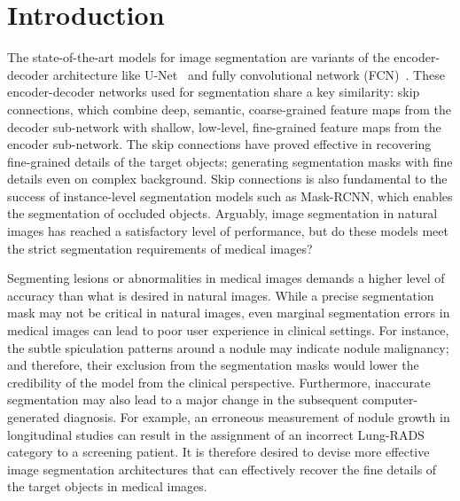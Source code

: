 \documentclass[runningheads]{llncs}
\begin{document}
\section{Introduction}
\label{sec:introduction}











The state-of-the-art models for image segmentation are variants of the encoder-decoder architecture like U-Net~\cite{ronneberger2015u} and fully convolutional network (FCN)~\cite{long2015fully}. These encoder-decoder networks used for segmentation share a key similarity: skip connections, which combine deep, semantic, coarse-grained feature maps from the decoder sub-network with shallow, low-level, fine-grained feature maps from the encoder sub-network. The skip connections have proved effective in recovering fine-grained details of the target objects; generating segmentation masks with fine details even on complex background. Skip connections is also fundamental to the success of instance-level segmentation models such as Mask-RCNN, which enables the segmentation of occluded objects. Arguably, image segmentation in natural images has reached a satisfactory level of performance, but do these models meet the strict segmentation requirements of medical images?


Segmenting lesions or abnormalities in medical images demands a higher level of accuracy than what is desired in natural images. While a precise segmentation mask may not be critical in natural images, even marginal segmentation errors in medical images can lead to poor user experience in clinical settings. For instance, the subtle spiculation patterns around a nodule may indicate nodule malignancy; and therefore, their exclusion from the segmentation masks would lower the credibility of the model from the clinical perspective. Furthermore, inaccurate segmentation may also lead to a major change in the subsequent computer-generated diagnosis. For example, an erroneous measurement of nodule growth in longitudinal studies can result in the assignment of an incorrect Lung-RADS category to a screening patient. \iffalse staging of cancer or imprecise measurement of lung volume during the inhalation and exhalation may lead to the misdiagnosis of chronic obstructive pulmonary diseases.\fi It is therefore desired to devise more effective image segmentation architectures that can effectively recover the fine details of the target objects in medical images.
\end{document}
